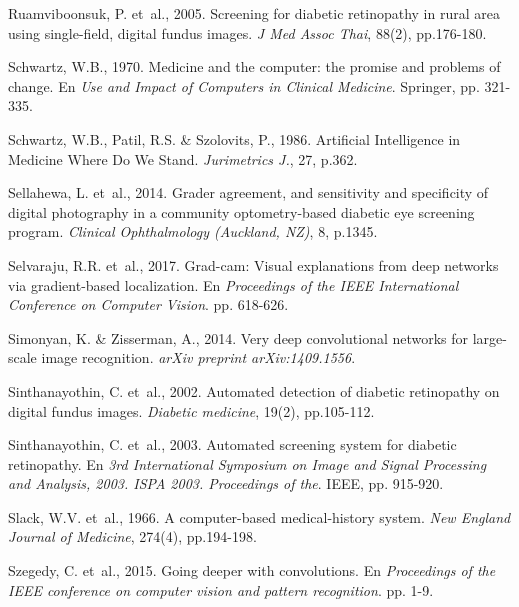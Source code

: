 \documentclass[
  12pt,
  spanish,
  a4paperpaper,
]{report}
\begin{document}
\leavevmode\hypertarget{ref-ruamviboonsuk2005screening}{}%
Ruamviboonsuk, P. et~al., 2005. Screening for diabetic retinopathy in
rural area using single-field, digital fundus images. \emph{J Med Assoc
Thai}, 88(2), pp.176-180.

\leavevmode\hypertarget{ref-schwartz1970medicine}{}%
Schwartz, W.B., 1970. Medicine and the computer: the promise and
problems of change. En \emph{Use and Impact of Computers in Clinical
Medicine}. Springer, pp. 321-335.

\leavevmode\hypertarget{ref-schwartz1986artificial}{}%
Schwartz, W.B., Patil, R.S. \& Szolovits, P., 1986. Artificial
Intelligence in Medicine Where Do We Stand. \emph{Jurimetrics J.}, 27,
p.362.

\leavevmode\hypertarget{ref-sellahewa2014grader}{}%
Sellahewa, L. et~al., 2014. Grader agreement, and sensitivity and
specificity of digital photography in a community optometry-based
diabetic eye screening program. \emph{Clinical Ophthalmology (Auckland,
NZ)}, 8, p.1345.

\leavevmode\hypertarget{ref-selvaraju2017grad}{}%
Selvaraju, R.R. et~al., 2017. Grad-cam: Visual explanations from deep
networks via gradient-based localization. En \emph{Proceedings of the
IEEE International Conference on Computer Vision}. pp. 618-626.

\leavevmode\hypertarget{ref-simonyan2014very}{}%
Simonyan, K. \& Zisserman, A., 2014. Very deep convolutional networks
for large-scale image recognition. \emph{arXiv preprint
arXiv:1409.1556}.

\leavevmode\hypertarget{ref-sinthanayothin2002automated}{}%
Sinthanayothin, C. et~al., 2002. Automated detection of diabetic
retinopathy on digital fundus images. \emph{Diabetic medicine}, 19(2),
pp.105-112.

\leavevmode\hypertarget{ref-sinthanayothin2003automated}{}%
Sinthanayothin, C. et~al., 2003. Automated screening system for diabetic
retinopathy. En \emph{3rd International Symposium on Image and Signal
Processing and Analysis, 2003. ISPA 2003. Proceedings of the}. IEEE, pp.
915-920.

\leavevmode\hypertarget{ref-slack1966computer}{}%
Slack, W.V. et~al., 1966. A computer-based medical-history system.
\emph{New England Journal of Medicine}, 274(4), pp.194-198.

\leavevmode\hypertarget{ref-szegedy2015going}{}%
Szegedy, C. et~al., 2015. Going deeper with convolutions. En
\emph{Proceedings of the IEEE conference on computer vision and pattern
recognition}. pp. 1-9.
\end{document}
